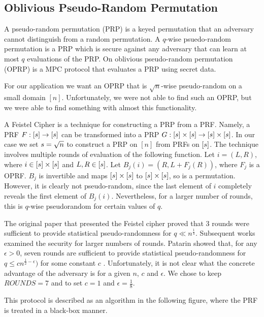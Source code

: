 \subsection{Oblivious Pseudo-Random Permutation}

A pseudo-random permutation (PRP) is a keyed permutation
that an adversary cannot distinguish from a random permutation.
A $q$-wise psuedo-random permutation is a PRP which is secure against
any adversary that can learn at most $q$ evaluations of the PRP.
On oblivious pseudo-random permutation (OPRP) is a MPC protocol
that evaluates a PRP using secret data.

For our application we want an OPRP that is $\sqrt{n}$-wise pseudo-random
on a small domain $[n]$. 
Unfortunately, we were not able to find such an OPRP, but we were able
to find something with almost this functionality.

A Feistel Cipher is a technique for constructing a PRP from a PRF.
Namely, a PRF $F : [s] \rightarrow[s]$ can be transformed
into a PRP $G : [s] \times [s] \rightarrow [s] \times [s]$. 
In our case we set $s = \sqrt{n}$ to construct a PRP on 
$[n]$ from PRFs on $[s]$.
The technique involves multiple rounds of evaluation of the following function.
Let $i = (L, R)$, where $i \in [s] \times [s]$ and $L, R \in [s]$.
Let $B_j(i) = (R, L + F_j(R))$, where $F_j$ is a OPRF.
$B_j$ is invertible and maps $[s] \times [s]$ to $[s] \times [s]$, 
so is a permutation.
However, it is clearly not pseudo-random, since the last element of $i$ 
completely reveals the first element of $B_j(i)$.
Nevertheless, for a larger number of rounds, this is $q$-wise 
pseudorandom for certain values of $q$.

The original paper that presented the Feistel cipher \cite{luby1988construct}
proved that 3 rounds were sufficient to provide statistical pseudo-randomness
for $q \ll n^{\frac{1}{4}}$.
Subsequent works examined the security for larger numbers of rounds.
Patarin showed that, for any $\epsilon > 0$,
seven rounds are sufficient to provide statistical pseudo-randomness for 
$q \leq c n^{\frac{1}{2} - \epsilon})$ for some constant $c$ 
\cite{patarin2003luby}.
Unfortunately, it is not clear what the concrete advantage of the
adversary is for a given $n$, $c$ and $\epsilon$.
We chose to keep $ROUNDS=7$ and to set $c=1$ and $\epsilon = \frac{1}{8}$.

This protocol is described as an algorithm in the following figure,
where the PRF is treated in a black-box manner.

